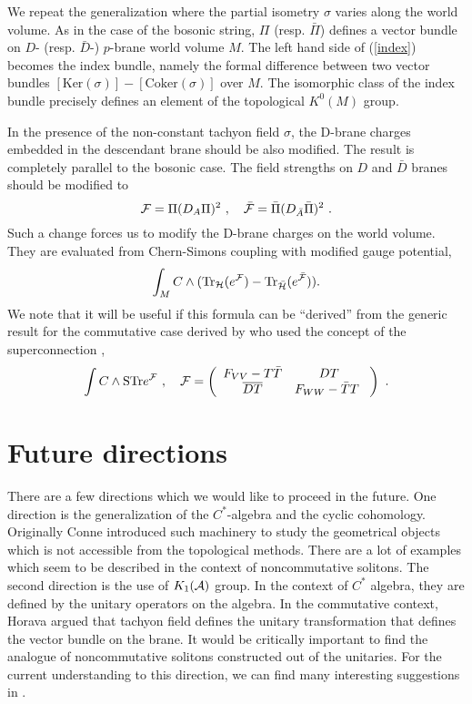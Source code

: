 \documentclass[a4paper,12pt]{article}
\begin{document}
We repeat the generalization where the partial isometry $\sigma$
varies along the world volume.
As in the case of the bosonic string,
$\Pi$ (resp. $\bar\Pi$) defines a vector bundle on
$D$- (resp. $\bar D$-) $p$-brane world volume $M$. 
The left hand side of (\ref{index}) 
becomes the index bundle, namely the formal difference
between two vector bundles $[\mbox{Ker}(\sigma)]-
[\mbox{Coker}(\sigma)]$ over $M$.
The isomorphic class of the index bundle precisely
defines an element of the topological $K^0(M)$ group.

In the presence of the non-constant tachyon field $\sigma$, 
the D-brane charges embedded in the descendant 
brane should be also modified.
The result is completely parallel to
the bosonic case. The field strengths
on $D$ and $\bar{D}$ branes should be modified to
\begin{equation}
 {\cal F}=\Pi(D_A \Pi)^2\,\,,\quad
 \bar{{\cal F}}=\bar\Pi(D_{\bar A} \bar\Pi)^2\,\,.
\end{equation}
Such a change forces us to modify the
D-brane charges on the world volume.
They are evaluated from
Chern-Simons coupling\cite{r:CS} with modified
gauge potential,
\begin{equation}\label{brane_charge}
  \int_{M} C \wedge
  (\mbox{Tr}_{\cal H}(e^{\cal F})-\mbox{Tr}_{\bar{{\cal H}}}(e^{\bar{{\cal F}}})).
\end{equation}
We note that it will be useful if this formula 
can be ``derived'' from the generic result for
the commutative case derived by
\cite{r:KW} who used the concept of the superconnection \cite{r:Q},
\begin{equation}
 \int C\wedge \mbox{STr} e^{{\cal F}}\,\,,\quad
 {\cal F}=\left(
\begin{array}{c c}
 F_{VV}-T\bar T& DT\\
 \overline{DT} & F_{WW} -\bar T T\,\,
\end{array}
\right)\,\,.
\end{equation}

\section{Future directions}
There are a few directions which we would like to
proceed in the future.  One direction is the generalization
of the $C^*$-algebra and the cyclic cohomology. 
Originally Conne introduced such machinery
to study the geometrical objects which is not
accessible from the topological methods.  There are a lot
of examples which seem to be described in the context of
noncommutative solitons.  The second direction is
the use of $K_1({{\cal A}})$ group.  In the context of $C^*$ algebra,
they are defined by the unitary operators on the algebra.
In the commutative context, Horava \cite{r:Horava} argued that
tachyon field defines the unitary transformation that
defines the vector bundle on the brane. 
It would be critically important to find the analogue of
noncommutative solitons constructed out of the unitaries.
For the current understanding to this direction, 
we can find many interesting suggestions in \cite{r:Witten3}.
\end{document}
